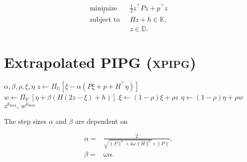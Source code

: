 \documentclass[letterpaper,11pt]{article}
\newcommand{\xpipg}{\textsc{\relsize{-1}x\relsize{1}pipg}}
\begin{document}
\begin{subequations}
\begin{align}
\underset{z}{\operatorname{minimize}}~~&~\frac{1}{2}z^\top P  z + p^\top z\\
    \operatorname{subject~to}~~&~Hz + h \in \mathbb{K},\\
    &~z\in\mathbb{D}.    
\end{align}    
\end{subequations}

\clearpage

\section{Extrapolated PIPG (\xpipg)}

\begin{algorithm}[!htpb]
\caption{Vectorized \xpipg}
\label{alg:xpipg-vec}
\begin{algorithmic}[1]
    \Require $\alpha,\beta,\rho,\xi,\eta$
        \State $z \gets \Pi_{\mathbb{D}}\left[ \xi - \alpha (P\xi + p + H^\top\eta) \right]$
        \State $w \gets \Pi_{\mathbb{K}^\circ}\left[ \eta + \beta ( H (2z-\xi) + h ) \right]$
        \State $\xi \gets (1-\rho)\xi + \rho z$
        \State $\eta \gets (1-\rho)\eta + \rho w$
    \EndFor
    \Ensure $z^{k_{\max}},\,w^{k_{\max}}$
\end{algorithmic}
\end{algorithm}

The step sizes $\alpha$ and $\beta$ are dependent on 

\begin{subequations}
\begin{align}
    \alpha ={} & \frac{2}{\sqrt{\|P\|^2 + 4\omega\|H\|^2}  + \|P\|},\\
    \beta ={} & \omega\alpha.
\end{align}    
\end{subequations}

\newcommand{\tlx}{\tilde{x}}
\newcommand{\tlu}{\tilde{u}}
\newcommand{\tlphi}{\tilde{\phi}}
\newcommand{\tltheta}{\tilde{\theta}}
\newcommand{\tlpsi}{\tilde{\psi}}
\end{document}
